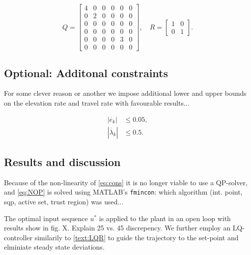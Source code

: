 \begin{equation}
Q = \begin{bmatrix}4&0&0&0&0&0\\0&2&0&0&0&0\\0&0&0&0&0&0\\0&0&0&0&0&0\\0&0&0&0&3&0\\0&0&0&0&0&0\end{bmatrix}, \quad R = \begin{bmatrix}1&0\\0&1\end{bmatrix}.
\end{equation}
\subsection{Optional: Additonal constraints}

For some clever reason or another we impose additional lower and upper bounds on the elevation rate and travel rate with favourable results...

\begin{align*}
	|\dot{e_k}| &\le 0.05, \\
	|\dot{\lambda_k}| &\le 0.5.
\end{align*}
\subsection{Results and discussion}
 Because of the non-linearity of \eqref{eq:cons} it is no longer viable to use a QP-solver, and \eqref{eq:NOP} is solved using MATLAB's \texttt{fmincon}: which algorithm (int. point, sqp, active set, trust region) was used...

The optimal input sequence $u^*$ is applied to the plant in an open loop with results show in fig. X. Explain 25 vs. 45 discrepency. We further employ an LQ-controller similarily to \ref{text:LQR} to guide the trajectory to the set-point and elminiate steady state deviations.

